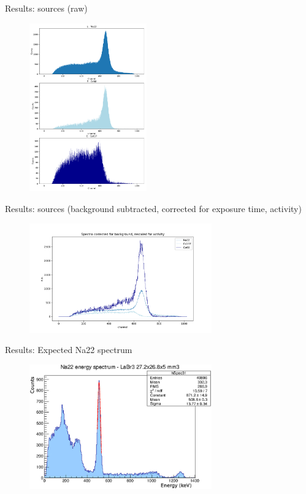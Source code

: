 \begin{frame}{Results: sources (raw)}
    \begin{figure}
        \centering
        \includegraphics[width=0.45\textwidth]{images/spectra_raw.png}
    \end{figure}
\end{frame}

\begin{frame}{Results: sources (background subtracted, corrected for exposure time, activity)}
    \begin{figure}
        \centering
        \includegraphics[width=0.7\textwidth]{images/spectra_adjusted.png}
    \end{figure}
\end{frame}

\begin{frame}{Results: Expected Na22 spectrum}
    \begin{figure}
        \centering
        \includegraphics[width=0.7\textwidth]{images/Na22_expected_spectrum.jpg}
    \end{figure}
\end{frame}

